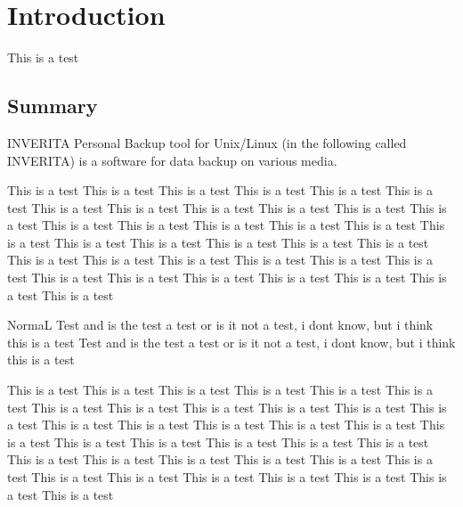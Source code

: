 %
%
%
%


\chapter{Introduction}

\begin{note}
This is a test
\end{note}

\section{Summary}
INVERITA Personal Backup tool for Unix/Linux (in the following called INVERITA)
is a software for data backup on various media.

\begin{note}
This is a test This is a test This is a test This is a test This is a test This is a test
This is a test This is a test This is a test This is a test This is a test This is a test
This is a test This is a test This is a test This is a test This is a test This is a test
This is a test This is a test This is a test This is a test This is a test This is a test
This is a test This is a test This is a test This is a test This is a test This is a test
This is a test This is a test This is a test This is a test This is a test This is a test
\end{note}

NormaL Test and is the test a test or is it not a test, i dont know, but i think this is a test
 Test and is the test a test or is it not a test, i dont know, but i think this is a test

\begin{warning}
This is a test This is a test This is a test This is a test This is a test This is a test
This is a test This is a test This is a test This is a test This is a test This is a test
This is a test This is a test This is a test This is a test This is a test This is a test
This is a test This is a test This is a test This is a test This is a test This is a test
This is a test This is a test This is a test This is a test This is a test This is a test
This is a test This is a test This is a test This is a test This is a test This is a test
\end{warning}

